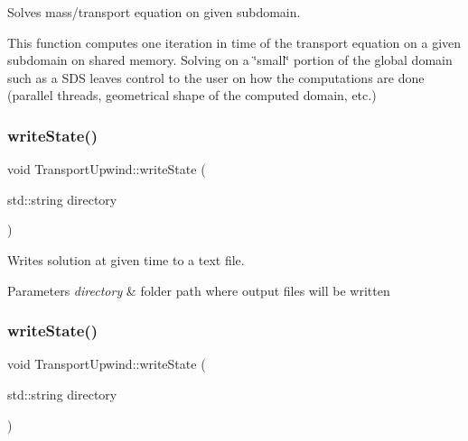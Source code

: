 Solves mass/transport equation on given subdomain. 

This function computes one iteration in time of the transport equation on a given subdomain on shared memory. Solving on a \char`\"{}small\char`\"{} portion of the global domain such as a S\+DS leaves control to the user on how the computations are done (parallel threads, geometrical shape of the computed domain, etc.) \mbox{\label{classTransportUpwind_a6eb3dea8ecfa8441e56b0c0f8f787377}} 
\subsubsection{\texorpdfstring{write\+State()}{writeState()}\hspace{0.1cm}{\footnotesize\ttfamily [1/4]}}
{\footnotesize\ttfamily void Transport\+Upwind\+::write\+State (\begin{DoxyParamCaption}\item[{std\+::string}]{directory }\end{DoxyParamCaption})}



Writes solution at given time to a text file. 


\begin{DoxyParams}{Parameters}
{\em directory} & folder path where output files will be written \\
\hline
\end{DoxyParams}
\mbox{\label{classTransportUpwind_a6eb3dea8ecfa8441e56b0c0f8f787377}} 
\subsubsection{\texorpdfstring{write\+State()}{writeState()}\hspace{0.1cm}{\footnotesize\ttfamily [2/4]}}
{\footnotesize\ttfamily void Transport\+Upwind\+::write\+State (\begin{DoxyParamCaption}\item[{std\+::string}]{directory }\end{DoxyParamCaption})}



